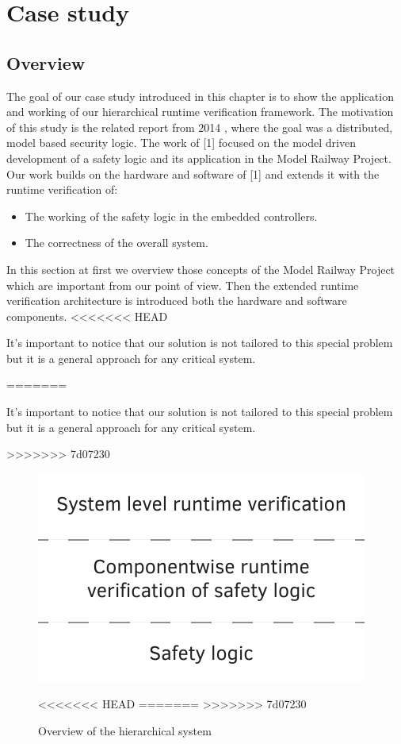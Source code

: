 \chapter{Case study}
\label{chap:case_study}

\section{Overview}

The goal of our case study introduced in this chapter is to show the application and working of our hierarchical runtime verification framework. The motivation of this study is the related report from 2014 \citep{tdk2014}, where the goal was a distributed, model based security logic. The work of [1] focused on the model driven development of a safety logic and its application in the Model Railway Project. Our work builds on the hardware and software of [1] and extends it with the runtime verification of:
\begin{itemize}
	\item The working of the safety logic in the embedded controllers.
	\item The correctness of the overall system.
\end{itemize}

In this section at first we overview those concepts of the Model Railway Project which are important from our point of view. Then the extended runtime verification architecture is introduced both the hardware and software components.
<<<<<<< HEAD

It's important to notice that our solution is not tailored to this special problem but it is a general approach for any critical system.

=======

It's important to notice that our solution is not tailored to this special problem but it is a general approach for any critical system.

>>>>>>> 7d07230
\begin{figure}[h]
	\centering
	\includegraphics[width=0.5\linewidth]{include/figures/chapter_6/overview_1}
	\caption{Overview of the hierarchical system}
<<<<<<< HEAD
	\label{fig:case_study:fov} 
=======
	\label{fig:case_study:fov}
>>>>>>> 7d07230
\end{figure}

